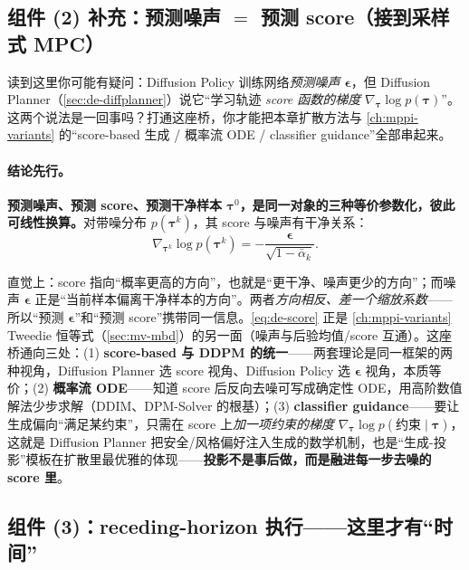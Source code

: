 \subsection{组件 (2) 补充：预测噪声 \texorpdfstring{$=$}{=} 预测 score（接到采样式 MPC）}
\label{sec:de-score}

读到这里你可能有疑问：Diffusion Policy 训练网络\emph{预测噪声 $\boldsymbol{\epsilon}$}，但 Diffusion Planner（\cref{sec:de-diffplanner}）说它“学习轨迹 \emph{score 函数的梯度} $\nabla_{\boldsymbol{\tau}}\log p(\boldsymbol{\tau})$”。这两个说法是一回事吗？打通这座桥，你才能把本章扩散方法与 \cref{ch:mppi-variants} 的“score-based 生成 / 概率流 ODE / classifier guidance”全部串起来。

\paragraph{结论先行。}
\textbf{预测噪声、预测 score、预测干净样本 $\boldsymbol{\tau}^0$，是同一对象的三种等价参数化，彼此可线性换算。}对带噪分布 $p(\boldsymbol{\tau}^k)$，其 score 与噪声有干净关系：
\begin{equation}
  \nabla_{\boldsymbol{\tau}^k}\log p(\boldsymbol{\tau}^k)=-\frac{\boldsymbol{\epsilon}}{\sqrt{1-\bar\alpha_k}}.
  \label{eq:de-score}
\end{equation}

\begin{insight}[“噪声 $=$ 负的 score $\times$ 系数”一旦看穿，三篇扩散工作合为一体]
直觉上：score 指向“概率更高的方向”，也就是“更干净、噪声更少的方向”；而噪声 $\boldsymbol{\epsilon}$ 正是“当前样本偏离干净样本的方向”。两者\emph{方向相反、差一个缩放系数}——所以“预测 $\boldsymbol{\epsilon}$”和“预测 score”携带同一信息。\cref{eq:de-score} 正是 \cref{ch:mppi-variants} Tweedie 恒等式（\cref{sec:mv-mbd}）的另一面（噪声与后验均值/score 互通）。这座桥通向三处：(1) \textbf{score-based 与 DDPM 的统一}\cite{song2019score}——两套理论是同一框架的两种视角，Diffusion Planner 选 score 视角、Diffusion Policy 选 $\boldsymbol{\epsilon}$ 视角，本质等价；(2) \textbf{概率流 ODE}——知道 score 后反向去噪可写成确定性 ODE，用高阶数值解法少步求解（DDIM、DPM-Solver 的根基）；(3) \textbf{classifier guidance}——要让生成偏向“满足某约束”，只需在 score 上\emph{加一项约束的梯度} $\nabla_{\boldsymbol{\tau}}\log p(\text{约束}\mid\boldsymbol{\tau})$，这就是 Diffusion Planner 把安全/风格偏好注入生成的数学机制，也是“生成-投影”模板在扩散里最优雅的体现——\textbf{投影不是事后做，而是融进每一步去噪的 score 里}。
\end{insight}

\subsection{组件 (3)：receding-horizon 执行——这里才有“时间”}
\label{sec:de-receding}


